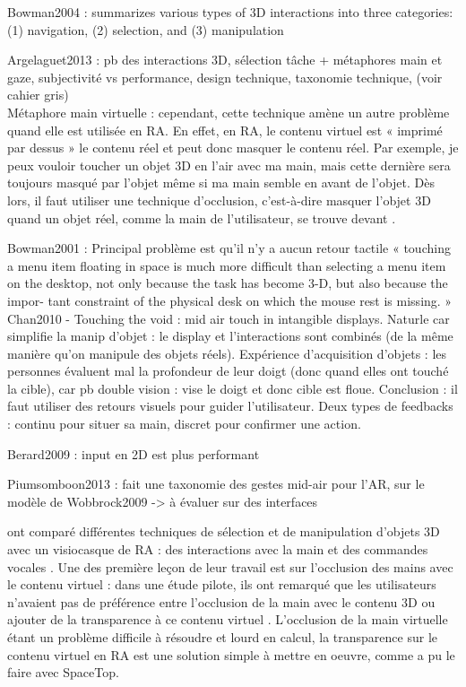 Bowman2004 : summarizes various types of 3D interactions into three categories: (1) navigation, (2) selection, and (3)
manipulation

Argelaguet2013 : pb des interactions 3D, sélection tâche + métaphores main et gaze, subjectivité vs performance, design technique, taxonomie technique,  (voir cahier gris)\\
Métaphore main virtuelle : cependant, cette technique amène un autre problème quand elle est utilisée en RA. En effet, en RA, le contenu virtuel est « imprimé par dessus » le contenu réel et peut donc masquer le contenu réel. Par exemple, je peux vouloir toucher un objet 3D en l'air avec ma main, mais cette dernière sera toujours masqué par l'objet même si ma main semble en avant de l'objet. Dès lors, il faut utiliser une technique d'occlusion, c'est-à-dire masquer l'objet 3D quand un objet réel, comme la main de l'utilisateur, se trouve devant .


Bowman2001 : Principal problème est qu'il n'y a aucun retour tactile « touching a menu item floating in space is much more difficult than selecting a menu item on the desktop, not only because the task has become 3-D, but also because the impor- tant constraint of the physical desk on which the mouse rest is missing. »\\
Chan2010 - Touching the void : mid air touch in intangible displays. Naturle car simplifie la manip d'objet : le display et l'interactions sont combinés (de la même manière qu'on manipule des objets réels). Expérience d'acquisition d'objets : les personnes évaluent mal la profondeur de leur doigt (donc quand elles ont touché la cible), car pb double vision : vise le doigt et donc cible est floue. Conclusion : il faut utiliser des retours visuels pour guider l'utilisateur. Deux types de feedbacks : continu pour situer sa main, discret pour confirmer une action.

Berard2009 : input en 2D est plus performant

Piumsomboon2013 : fait une taxonomie des gestes mid-air pour l'AR, sur le modèle de Wobbrock2009 -> à évaluer sur des interfaces

\cite{Piumsomboon2014} ont comparé différentes techniques de sélection et de manipulation d'objets 3D avec un visiocasque de RA : des interactions avec la main et des commandes vocales . Une des première leçon de leur travail est sur l'occlusion des mains avec le contenu virtuel : dans une étude pilote, ils ont remarqué que les utilisateurs n'avaient pas de préférence entre l'occlusion de la main avec le contenu 3D ou ajouter de la transparence à ce contenu virtuel . L'occlusion de la main virtuelle étant un problème difficile à résoudre et lourd en calcul, la transparence sur le contenu virtuel en RA est une solution simple à mettre en oeuvre, comme a pu le faire \cite{Lee2013} avec SpaceTop.

